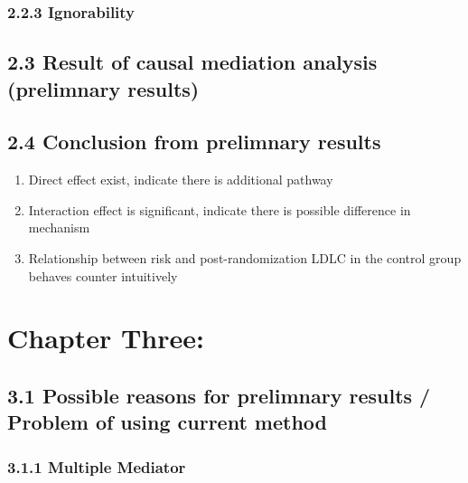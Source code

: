 \documentclass[
  english,
  man]{apa6}
\providecommand{\tightlist}{%
  \setlength{\itemsep}{0pt}\setlength{\parskip}{0pt}}
\begin{document}
\hypertarget{ignorability}{%
\subsubsection{2.2.3 Ignorability}\label{ignorability}}

\hypertarget{result-of-causal-mediation-analysis-prelimnary-results}{%
\subsection{2.3 Result of causal mediation analysis (prelimnary results)}\label{result-of-causal-mediation-analysis-prelimnary-results}}

\hypertarget{conclusion-from-prelimnary-results}{%
\subsection{2.4 Conclusion from prelimnary results}\label{conclusion-from-prelimnary-results}}

\begin{enumerate}
\def\labelenumi{\arabic{enumi}.}
\tightlist
\item
  Direct effect exist, indicate there is additional pathway\n
\item
  Interaction effect is significant, indicate there is possible difference in mechanism\n
\item
  Relationship between risk and post-randomization LDLC in the control group behaves counter intuitively\n
\end{enumerate}

\hypertarget{chapter-three}{%
\section{Chapter Three:}\label{chapter-three}}

\hypertarget{possible-reasons-for-prelimnary-results-problem-of-using-current-method}{%
\subsection{3.1 Possible reasons for prelimnary results / Problem of using current method}\label{possible-reasons-for-prelimnary-results-problem-of-using-current-method}}

\hypertarget{multiple-mediator}{%
\subsubsection{3.1.1 Multiple Mediator}\label{multiple-mediator}}
\end{document}
